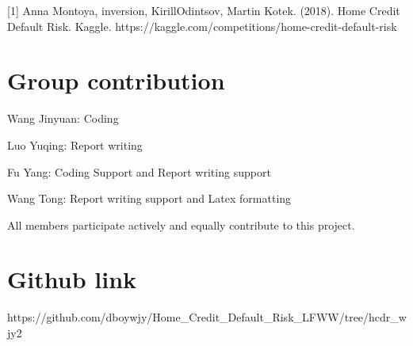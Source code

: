\documentclass{article}
\begin{document}
\medskip

\small

[1] Anna Montoya, inversion, KirillOdintsov, Martin Kotek. (2018). Home Credit Default Risk. Kaggle. https://kaggle.com/competitions/home-credit-default-risk

\section*{Group contribution}
Wang Jinyuan: Coding

Luo Yuqing: Report writing

Fu Yang: Coding Support and Report writing support

Wang Tong: Report writing support and Latex formatting

All members participate actively and equally contribute to this project.

\section*{Github link}
https://github.com/dboywjy/Home\_Credit\_Default\_Risk\_LFWW/tree/hcdr\_wjy2
\end{document}
